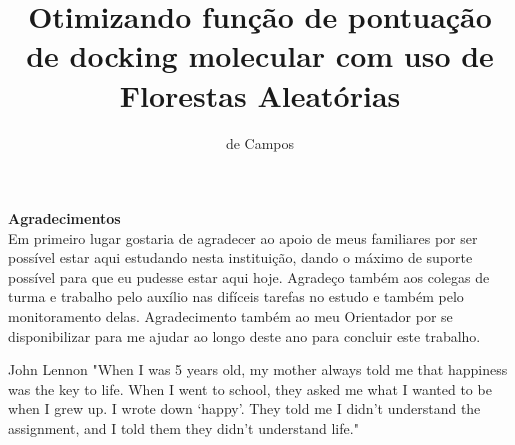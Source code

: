 \documentclass[tcc, capa]{texucpel}
\title{Otimizando função de pontuação de docking molecular com uso de Florestas Aleatórias}
\author{de Campos}{Gianluca}
\begin{document}
\renewcommand{\advisorname}
{Orientador}          
\maketitle 
\sloppy

\begin{agradecimentos}
\textbf{Agradecimentos} \\
Em primeiro lugar gostaria de agradecer ao apoio de meus familiares por ser possível estar aqui estudando nesta instituição, dando o máximo de suporte possível para que eu pudesse estar aqui hoje. Agradeço também aos colegas de turma e trabalho pelo auxílio nas difíceis tarefas no estudo e também pelo monitoramento delas. Agradecimento também ao meu Orientador por se disponibilizar para me ajudar ao longo deste ano para concluir este trabalho.
\vspace{\baselineskip}
\end{agradecimentos}


\begin{epigrafe}{John Lennon}
"When I was 5 years old, my mother always told me that happiness was the key to life. When I went to school, they asked me what I wanted to be when I grew up. I wrote down ‘happy’. They told me I didn’t understand the assignment, and I told them they didn’t understand life."\\
\end{epigrafe}
\end{document}
